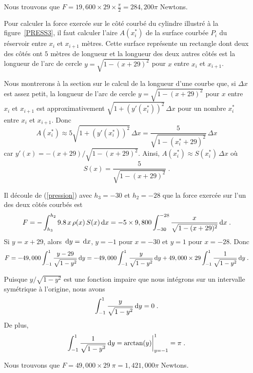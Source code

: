 {\begin{egg}
Nous trouvons que
$\displaystyle F = 19,600\times 29 \times \frac{\pi}{2} = 284,200\pi$
Newtons.


Pour calculer la force exercée sur le côté courbé du cylindre illustré à la
figure~\ref{PRESS3}, il faut calculer l'aire $A(x_i^\ast)$ de la surface
courbée $P_i$ du réservoir entre $x_i$ et $x_{i+1}$ mètres.  Cette surface
représente un rectangle dont deux des côtés ont $5$ mètres de longueur et la
longueur des deux autres côtés est la longueur de l'arc de cercle
$y=\sqrt{1-(x+29)^2}$ pour $x$ entre $x_i$ et $x_{i+1}$.

Nous montrerons à la section sur le calcul de la longueur d'une courbe que, si
$\Delta x$ est assez petit, la longueur de l'arc de cercle
$y=\sqrt{1-(x+29)^2}$ pour $x$ entre $x_i$ et $x_{i+1}$ est approximativement
$\sqrt{1+(y'(x_i^\ast))^2} \, \Delta x$ pour un nombre $x_i^\ast$ entre $x_i$
et $x_{i+1}$.  Donc
\[
A(x_i^\ast) \approx 5 \sqrt{1+(y'(x_i^\ast))^2} \, \Delta x
= \frac{5}{\sqrt{1-(x_i^\ast+29)^2}} \, \Delta x
\]
car $y'(x) = -(x+29)/\sqrt{1-(x+29)^2}$.
Ainsi, $A(x_i^\ast) \approx S(x_i^\ast) \, \Delta x$ où
\[
S(x) = \frac{5}{\sqrt{1-(x+29)^2}} \; .
\]

Il découle de (\ref{pression}) avec $h_3 = -30$ et $h_2 = -28$ que la
force exercée sur l'un des deux côtés courbés est
\[
F = -\int_{h_3}^{h_2} 9.8 \, x\, \rho(x)\, S(x)\,\mathrm{d}x
= - 5\times 9,800 \int_{-30}^{-28} \frac{x}{\sqrt{1-(x+29)^2}} \,\mathrm{d}x \; .
\]
Si $y = x+29$, alors $\,\mathrm{d}y = \,\mathrm{d}x$, $y=-1$ pour $x=-30$
et $y=1$ pour $x=-28$.  Donc
\[
F = -49,000 \int_{-1}^{1} \frac{y-29}{\sqrt{1-y^2}} \,\mathrm{d}y
= - 49,000 \int_{-1}^{1} \frac{y}{\sqrt{1-y^2}} \,\mathrm{d}y
+ 49,000\times 29 \int_{-1}^{1} \frac{1}{\sqrt{1-y^2}} \,\mathrm{d}y \; .
\]

Puisque $y/\sqrt{1-y^2}$ est une fonction impaire que nous intégrons sur un
intervalle symétrique à l'origine, nous avons
\[
\int_{-1}^{1} \frac{y}{\sqrt{1-y^2}} \,\mathrm{d}y = 0 \; .
\]
De plus,
\[
\int_{-1}^{1} \frac{1}{\sqrt{1-y^2}} \,\mathrm{d}y =
\arctan(y)\bigg|_{y=-1}^1 = \pi \; .
\]

Nous trouvons que $F = 49,000\times 29 \; \pi = 1,421,000\pi$ Newtons.
\end{egg}

}
